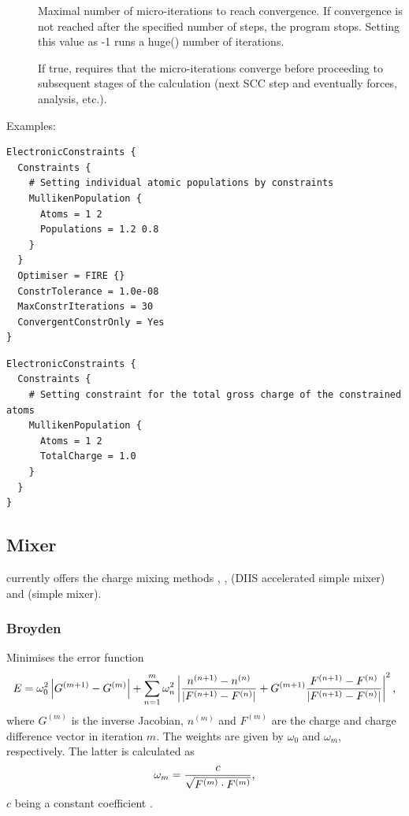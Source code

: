 \begin{description}
\item[] Maximal number of micro-iterations to reach
  convergence. If convergence is not reached after the specified
  number of steps, the program stops. Setting this value as -1 runs a
  huge() number of iterations.

\item[] If true, requires that the micro-iterations
  converge before proceeding to subsequent stages of the calculation (next SCC
  step and eventually forces, analysis, etc.).
\end{description}

Examples:
\begin{verbatim}
ElectronicConstraints {
  Constraints {
    # Setting individual atomic populations by constraints
    MullikenPopulation {
      Atoms = 1 2
      Populations = 1.2 0.8
    }
  }
  Optimiser = FIRE {}
  ConstrTolerance = 1.0e-08
  MaxConstrIterations = 30
  ConvergentConstrOnly = Yes
}
\end{verbatim}

\begin{verbatim}
ElectronicConstraints {
  Constraints {
    # Setting constraint for the total gross charge of the constrained atoms
    MullikenPopulation {
      Atoms = 1 2
      TotalCharge = 1.0
    }
  }
}
\end{verbatim}


\subsection{Mixer}
\label{sec:dftbp.Mixer}

{\dftbp} currently offers the charge mixing methods ,
,  (DIIS accel\-er\-ated simple mixer) and
 (simple mixer).

\subsubsection{Broyden\cb}
\label{sec:dftbp.Broyden}

Minimises the error function
\begin{equation*}
  E = \omega_0^2 \left| G^{(m+1)} - G^{(m)}\right| + \sum_{n=1}^m
  \omega_n^2 \left|
    \frac{n^{(n+1)} - n^{(n)}}{|F^{(n+1)}  - F^{(n)}|}
    + G^{(m+1)}
    \frac{F^{(n+1)}  - F^{(n)}}{|F^{(n+1)}  - F^{(n)}|} \right|^2
  \text,
\end{equation*}
where $G^{(m)}$ is the inverse Jacobian, $n^{(m)}$ and $F^{(m)}$ are
the charge and charge difference vector in iteration $m$. The weights
are given by $\omega_0$ and $\omega_m$, respectively. The latter is
calculated as
\begin{equation}
  \label{eq:omega_m}
  \omega_m = \frac{c}{\sqrt{F^{(m)}\cdot F^{(m)}}}
  \text,
\end{equation}
$c$ being a constant coefficient \cite{johnson-PRB-38-12807}.

